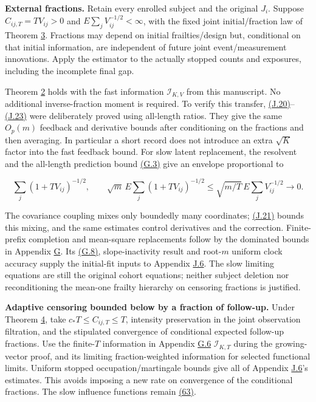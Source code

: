 \documentclass[11pt]{article}
\begin{document}
\textbf{External fractions.} Retain every enrolled subject and the original \(J_i\). Suppose \(C_{ij,T}=TV_{ij}>0\) and \(E\sum_jV_{ij}^{-1/2}<\infty\), with the fixed joint initial/fraction law of Theorem \hyperref[res:Theorem-3]{3}. Fractions may depend on initial frailties/design but, conditional on that initial information, are independent of future joint event/measurement innovations. Apply the estimator to the actually stopped counts and exposures, including the incomplete final gap.

Theorem \hyperref[res:Theorem-2]{2} holds with the fast information \(\mathcal I_{K,V}\) from this manuscript. No additional inverse-fraction moment is required. To verify this transfer, \hyperref[eq:J.20]{(J.20)}--\hyperref[eq:J.23]{(J.23)} were deliberately proved using all-length ratios. They give the same \(O_p(m)\) feedback and derivative bounds after conditioning on the fractions and then averaging. In particular a short record does not introduce an extra \(\sqrt K\) factor into the fast feedback bound. For slow latent replacement, the resolvent and the all-length prediction bound \hyperref[eq:G.3]{(G.3)} give an envelope proportional to

\begin{equation*}
\sum_j(1+TV_{ij})^{-1/2},\qquad
\sqrt m\,E\sum_j(1+TV_{ij})^{-1/2}
 \leq\sqrt{m/T}\,E\sum_jV_{ij}^{-1/2}\longrightarrow0.
\tag{J.29}\label{eq:J.29}
\end{equation*}

The covariance coupling mixes only boundedly many coordinates; \hyperref[eq:J.21]{(J.21)} bounds this mixing, and the same estimates control derivatives and the correction. Finite-prefix completion and mean-square replacements follow by the dominated bounds in Appendix \hyperref[sec:G]{G}. Its \hyperref[eq:G.8]{(G.8)}, slope-inactivity result and root-\(m\) uniform clock accuracy supply the initial-fit inputs to Appendix \hyperref[sec:J.6]{J.6}. The slow limiting equations are still the original cohort equations; neither subject deletion nor reconditioning the mean-one frailty hierarchy on censoring fractions is justified.

\textbf{Adaptive censoring bounded below by a fraction of follow-up.} Under Theorem \hyperref[res:Theorem-4]{4}, take \(c_*T\leq C_{ij,T}\leq T\), intensity preservation in the joint observation filtration, and the stipulated convergence of conditional expected follow-up fractions. Use the finite-\(T\) information in Appendix \hyperref[sec:G.6]{G.6} \(\mathcal I_{K,T}\) during the growing-vector proof, and its limiting fraction-weighted information for selected functional limits. Uniform stopped occupation/martingale bounds give all of Appendix \hyperref[sec:J.6]{J.6}'s estimates. This avoids imposing a new rate on convergence of the conditional fractions. The slow influence functions remain \hyperref[eq:63]{(63)}.
\end{document}
